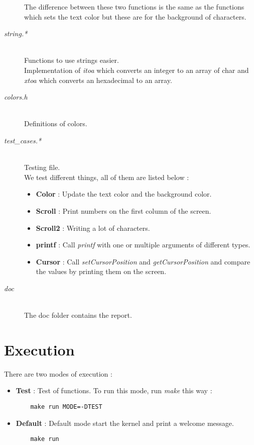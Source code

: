 \documentclass[a4paper]{article}
\begin{document}
\begin{description}
The difference between these two functions is the same as the functions which sets the text color but these are for the background of characters.

\item[\textit{string.*}] \hfill \\
Functions to use strings easier. \\
Implementation of \textit{itoa} which converts an integer to an array of char and \textit{xtoa} which converts an hexadecimal to an array.

\item[\textit{colors.h}] \hfill \\
Definitions of colors.

\item[\textit{test\_cases.*}] \hfill \\
Testing file.\\
We test different things, all of them are listed below :
\begin{itemize}
\item \textbf{Color} : Update the text color and the background color.
\item \textbf{Scroll} : Print numbers on the first column of the screen.
\item \textbf{Scroll2} : Writing a lot of characters.
\item \textbf{printf} : Call \textit{printf} with one or multiple arguments of different types.
\item \textbf{Cursor} : Call \textit{setCursorPosition} and \textit{getCursorPosition} and compare the values by printing them on the screen.
\end{itemize}

\item[\textit{doc}] \hfill \\
The doc folder contains the report.

\end{description}
\newpage
\section{Execution}

There are two modes of execution : 

\begin{itemize}
  \item \textbf{Test} : Test of functions. To run this mode, run \textit{make} this way :
    \begin{verbatim}
    make run MODE=-DTEST
    \end{verbatim}
  \item \textbf{Default} : Default mode start the kernel and print a welcome message.
    \begin{verbatim}
    make run
    \end{verbatim}
\end{itemize}
\end{document}
